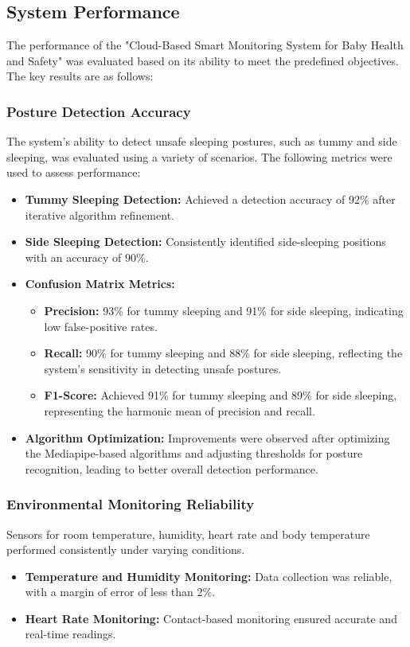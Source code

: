 \documentclass[conference]{IEEEtran}
\begin{document}
\subsection{System Performance}
The performance of the "Cloud-Based Smart Monitoring System for Baby Health and Safety" was evaluated based on its ability to meet the predefined objectives. The key results are as follows:

\subsubsection{Posture Detection Accuracy}
The system's ability to detect unsafe sleeping postures, such as tummy and side sleeping, was evaluated using a variety of scenarios. The following metrics were used to assess performance:

\begin{itemize}
    \item \textbf{Tummy Sleeping Detection:} Achieved a detection accuracy of 92\% after iterative algorithm refinement. 
    \item \textbf{Side Sleeping Detection:} Consistently identified side-sleeping positions with an accuracy of 90\%.
    \item \textbf{Confusion Matrix Metrics:} 
    \begin{itemize}
        \item \textbf{Precision:} 93\% for tummy sleeping and 91\% for side sleeping, indicating low false-positive rates.
        \item \textbf{Recall:} 90\% for tummy sleeping and 88\% for side sleeping, reflecting the system's sensitivity in detecting unsafe postures.
        \item \textbf{F1-Score:} Achieved 91\% for tummy sleeping and 89\% for side sleeping, representing the harmonic mean of precision and recall.
    \end{itemize}
    \item \textbf{Algorithm Optimization:} Improvements were observed after optimizing the Mediapipe-based algorithms and adjusting thresholds for posture recognition, leading to better overall detection performance.
\end{itemize}


\subsubsection{Environmental Monitoring Reliability}
Sensors for room temperature, humidity, heart rate and body temperature performed consistently under varying conditions.
\begin{itemize}
    \item \textbf{Temperature and Humidity Monitoring:} Data collection was reliable, with a margin of error of less than 2\%.
    \item \textbf{Heart Rate Monitoring:} Contact-based monitoring ensured accurate and real-time readings.
\end{itemize}
\end{document}
